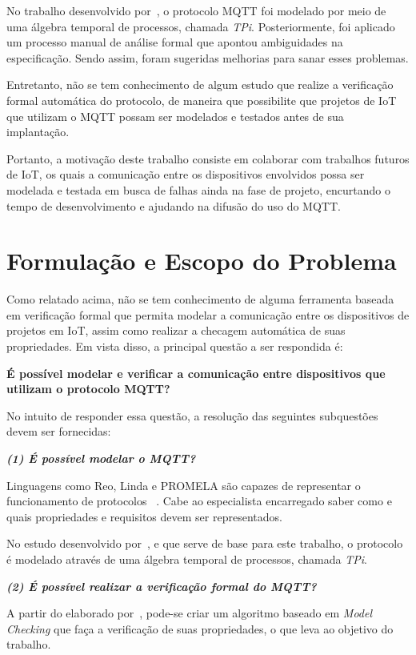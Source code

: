 No trabalho desenvolvido por~\citeauthor{aziz2016formal}, o protocolo MQTT foi modelado por meio de uma álgebra temporal de processos, chamada \textit{TPi}. Posteriormente, foi aplicado um processo manual de análise formal que apontou ambiguidades na especificação. Sendo assim, foram sugeridas melhorias para sanar esses problemas.

Entretanto, não se tem conhecimento de algum estudo que realize a verificação formal automática do protocolo, de maneira que possibilite que projetos de IoT que utilizam o MQTT possam ser modelados e testados antes de sua implantação.

Portanto, a motivação deste trabalho consiste em colaborar com trabalhos futuros de IoT, os quais a comunicação entre os dispositivos envolvidos possa ser modelada e testada em busca de falhas ainda na fase de projeto, encurtando o tempo de desenvolvimento e ajudando na difusão do uso do MQTT.

\section{Formulação e Escopo do Problema}

Como relatado acima, não se tem conhecimento de alguma ferramenta baseada em verificação formal que permita modelar a comunicação entre os dispositivos de projetos em IoT, assim como realizar a checagem automática de suas propriedades. Em vista disso, a principal questão a ser respondida é:

\textbf{É possível modelar e verificar a comunicação entre dispositivos que utilizam o protocolo MQTT?}

No intuito de responder essa questão, a resolução das seguintes subquestões devem ser fornecidas:

\textbf{\textit{(1) É possível modelar o MQTT?}}

Linguagens como Reo, Linda e  PROMELA são capazes de representar o funcionamento de protocolos ~\cite{reo, zenith1990linda, promela}. Cabe ao especialista encarregado saber como e quais propriedades e requisitos devem ser representados.

No estudo desenvolvido por~\citeauthor{aziz2016formal}, e que serve de base para este trabalho, o protocolo é modelado através de uma álgebra temporal de processos, chamada \textit{TPi}.

\textbf{\textit{(2) É possível realizar a verificação formal do MQTT?}}

A partir do elaborado por~\citeauthor{aziz2016formal}, pode-se criar um algoritmo baseado em \textit{Model Checking} que faça a verificação de suas propriedades, o que leva ao objetivo do trabalho.

